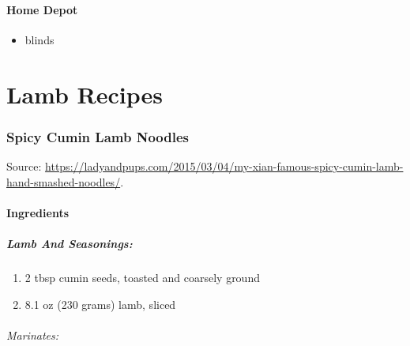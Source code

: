 \documentclass[
]{article}
\providecommand{\tightlist}{%
  \setlength{\itemsep}{0pt}\setlength{\parskip}{0pt}}
\begin{document}
\hypertarget{home-depot}{%
\subsection{Home Depot}\label{home-depot}}

\begin{itemize}
\tightlist
\item
  blinds
\end{itemize}

\hypertarget{part-lamb-recipes}{%
\part{Lamb Recipes}\label{part-lamb-recipes}}

\hypertarget{spicy-cumin-lamb-noodles}{%
\section{Spicy Cumin Lamb Noodles}\label{spicy-cumin-lamb-noodles}}

Source: \url{https://ladyandpups.com/2015/03/04/my-xian-famous-spicy-cumin-lamb-hand-smashed-noodles/}.

\hypertarget{ingredients-5}{%
\subsection{Ingredients}\label{ingredients-5}}

\hypertarget{lamb-and-seasonings}{%
\subsubsection{Lamb And Seasonings:}\label{lamb-and-seasonings}}

\begin{enumerate}
\def\labelenumi{\arabic{enumi}.}
\tightlist
\item
  2 tbsp cumin seeds, toasted and coarsely ground
\item
  8.1 oz (230 grams) lamb, sliced
\end{enumerate}

\hypertarget{marinates}{%
\paragraph{Marinates:}\label{marinates}}
\end{document}

